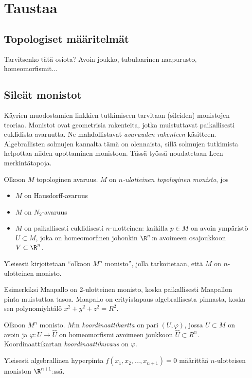 \section{Taustaa}

\subsection{Topologiset määritelmät}
Tarvitsenko tätä osiota? Avoin joukko, tubulaarinen naapurusto, homeomorfismit...
\subsection{Sileät monistot}
Käyrien muodostamien linkkien tutkimiseen tarvitaan (sileiden) monistojen teoriaa. Monistot ovat geometrisia rakenteita, jotka muistuttavat paikallisesti euklidista avaruutta. Ne mahdollistavat \textit{avaruuden rakenteen} käsitteen. Algebrallisten solmujen kannalta tämä on olennaista, sillä solmujen tutkimista helpottaa niiden upottaminen monistoon. Tässä työssä noudatetaan Leen \citep{Lee2012} merkintätapoja.
\begin{maaritelma}
    Olkoon $M$ topologinen avaruus. $M$ on \textit{$n$-ulotteinen topologinen monisto}, jos
    \begin{itemize}
        \item $M$ on Hausdorff-avaruus
        \item $M$ on $N_2$-avaruus
        \item $M$ on paikallisesti euklidisesti $n$-ulotteinen: kaikilla $p\in M$ on avoin ympäristö $U\subset M$, joka on homeomorfinen johonkin $\R^n$:n avoimeen osajoukkoon $V\subset\R^n$.
    \end{itemize}
\end{maaritelma}
\begin{huomautus}
    Yleisesti kirjoitetaan ``olkoon $M^n$ monisto'', jolla tarkoitetaan, että $M$ on $n$-ulotteinen monisto.
\end{huomautus}
\begin{esimerkki}
    Esimerkiksi Maapallo on 2-ulotteinen monisto, koska paikallisesti Maapallon pinta muistuttaa tasoa. Maapallo on erityistapaus algebrallisesta pinnasta, koska sen polynomiyhtälö $x^2+y^2+z^2=R^2$.
\end{esimerkki}
\begin{maaritelma}
    Olkoon $M^n$ monisto. $M$:n \textit{koordinaattikartta} on pari $(U,\varphi)$, jossa $U\subset M$ on avoin ja $\varphi:U\to\hat U$ on homeomorfismi avoimeen joukkoon $\hat U\subset R^n$. Koordinaattikartan \textit{koordinaattikuvaus} on $\varphi$.
\end{maaritelma}
\begin{esimerkki}
    Yleisesti algebrallinen hyperpinta $f(x_1,x_2,\dots,x_{n+1})=0$ määrittää $n$-ulotteisen moniston $\R^{n+1}$:ssä.
\end{esimerkki}


